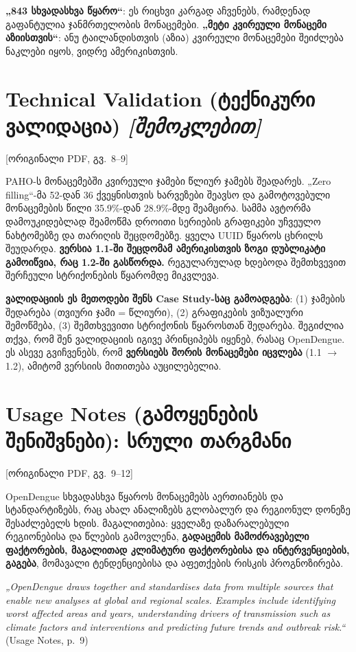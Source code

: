 \documentclass[11pt,a4paper]{article}
\newcommand{\imp}[1]{\textbf{\color{importred}#1}}
\newcommand{\pg}[1]{{\small\color{gray}[ორიგინალი PDF, გვ.~#1]}}
\begin{document}
\begin{etl}
\textbf{„843 სხვადასხვა წყარო“}: ეს რიცხვი კარგად აჩვენებს, რამდენად გაფანტულია ჯანმრთელობის მონაცემები. \textbf{„მეტი კვირეული
მონაცემი აზიისთვის“}: ანუ ტაილანდისთვის (აზია) კვირეული მონაცემები შეიძლება ნაკლები იყოს, ვიდრე ამერიკისთვის.
\end{etl}

\section{Technical Validation (ტექნიკური ვალიდაცია) \textit{[შემოკლებით]}} \pg{8--9}

PAHO-ს მონაცემებში კვირეული ჯამები წლიურ ჯამებს შეადარეს. „Zero filling“-მა 52-დან 36 ქვეყნისთვის ხარვეზები შეავსო და
გამოტოვებული მონაცემების წილი 35.9\%-დან 28.9\%-მდე შეამცირა. სამმა ავტორმა დამოუკიდებლად შეამოწმა დროითი სერიების გრაფიკები
უჩვეულო ნახტომებზე და თარიღის შეცდომებზე. ყველა UUID წყაროს ცხრილს შეუდარდა. \imp{ვერსია 1.1-ში შეცდომამ ამერიკისთვის ზოგი
დუბლიკატი გამოიწვია, რაც 1.2-ში გასწორდა.} რეგულარულად ხდებოდა შემთხვევით შერჩეული სტრიქონების წყარომდე მიკვლევა.

\begin{etl}
\textbf{ვალიდაციის ეს მეთოდები შენს Case Study-საც გამოადგება}: (1) ჯამების შედარება (თვიური ჯამი = წლიური), (2) გრაფიკების
ვიზუალური შემოწმება, (3) შემთხვევითი სტრიქონის წყაროსთან შედარება. შეგიძლია თქვა, რომ შენ ვალიდაციის იგივე პრინციპებს იყენებ,
რასაც OpenDengue. ეს ასევე გვიჩვენებს, რომ \imp{ვერსიებს შორის მონაცემები იცვლება} (1.1 $\rightarrow$ 1.2), ამიტომ ვერსიის მითითება აუცილებელია.
\end{etl}

\section{Usage Notes (გამოყენების შენიშვნები): სრული თარგმანი} \pg{9--12}

OpenDengue სხვადასხვა წყაროს მონაცემებს აერთიანებს და სტანდარტიზებს, რაც ახალ ანალიზებს გლობალურ და რეგიონულ დონეზე შესაძლებელს
ხდის. მაგალითებია: ყველაზე დაზარალებული რეგიონებისა და წლების გამოვლენა, \imp{გადაცემის მამოძრავებელი ფაქტორების, მაგალითად
კლიმატური ფაქტორებისა და ინტერვენციების, გაგება}, მომავალი ტენდენციებისა და აფეთქების რისკის პროგნოზირება.

\begin{citat}
\textit{„OpenDengue draws together and standardises data from multiple sources that enable new analyses at global and regional scales. Examples include identifying worst affected areas and years, understanding drivers of transmission such as climate factors and interventions and predicting future trends and outbreak risk.“} (Usage Notes, p.~9)
\end{citat}
\end{document}
